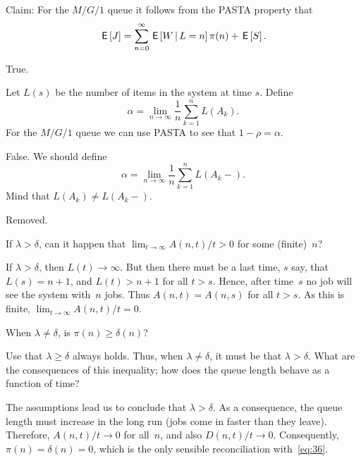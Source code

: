 \documentclass[stochastic-or.tex]{subfiles}
\begin{document}
\begin{truefalse}
Claim: For the $M/G/1$ queue it follows from the PASTA property that
 \begin{equation*}
\,\mathsf{E}\left[J\right] = \sum_{n=0}^\infty \,\mathsf{E}\left[W \,\middle|\, L=n\right] \pi(n) + \,\mathsf{E}\left[S\right].
 \end{equation*}
\begin{solution}
True.
\end{solution}
\end{truefalse}

\begin{truefalse}
Let $L(s)$ be the number of items in the system at time $s$.
Define
\begin{equation*}
\alpha = \lim_{n\to\infty} \frac 1 n \sum_{k=1}^n L(A_k).
\end{equation*}
For the $M/G/1$ queue we can use PASTA to see that $1-\rho = \alpha$.
\begin{solution} False.
We should define
\begin{equation*}
\alpha = \lim_{n\to\infty} \frac 1 n \sum_{k=1}^n L(A_k-).
\end{equation*}
Mind that $L(A_{k}) \neq L(A_{k}-)$.
\end{solution}
\end{truefalse}

\begin{exercise}\label{ex:36}
Removed.
\end{exercise}

\begin{exercise} \label{ex:38}
If $\lambda>\delta$, can it happen that $ \lim_{t\to\infty} A(n,t)/t > 0$ for some (finite)~$n$?
\begin{solution}
 If $\lambda > \delta$, then $L(t)\to\infty$.
 But then there must be a last time, $s$ say, that $L(s) = n+1$, and $L(t) > n+1$ for all $t>s$.
 Hence, after time~$s$ no job will see the system with~$n$ jobs.
 Thus $A(n,t) = A(n,s)$ for all $t>s$.
As this is  finite, $\lim_{t\to\infty}A(n,t)/t=0$.
\end{solution}
\end{exercise}


\begin{exercise}\label{ex:26}
 When $\lambda\neq \delta$, is $\pi(n)\geq \delta(n)$?
\begin{hint}
 Use that $\lambda \geq \delta$ always holds. Thus, when $\lambda \neq \delta$, it must be that $\lambda > \delta$. What are the consequences of this inequality; how does the queue length behave as a function of time?
\end{hint}
\begin{solution}
 The assumptions lead us to conclude that $\lambda > \delta$. As a consequence, the queue length must increase in the long run (jobs come in faster than they leave). Therefore, $A(n,t)/t \to 0$ for all~$n$, and also $D(n,t)/t\to 0$. Consequently, $\pi(n) = \delta(n) = 0$, which is the only sensible reconciliation with~\cref{eq:36}.
\end{solution}
\end{exercise}
\end{document}
